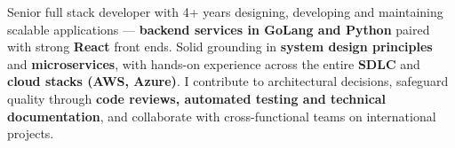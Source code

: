 
\begin{cvparagraph}
Senior full stack developer with 4+ years designing, developing and maintaining scalable applications --- \textbf{backend services in GoLang and Python} paired with strong \textbf{React} front ends. Solid grounding in \textbf{system design principles} and \textbf{microservices}, with hands-on experience across the entire \textbf{SDLC} and \textbf{cloud stacks (AWS, Azure)}. I contribute to architectural decisions, safeguard quality through \textbf{code reviews, automated testing and technical documentation}, and collaborate with cross-functional teams on international projects.
\end{cvparagraph}
